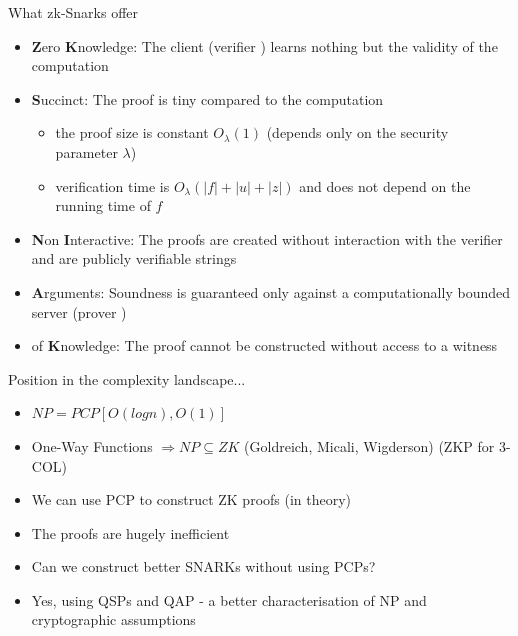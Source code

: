 \documentclass[handout]{beamer}
\begin{document}
\begin{frame}{What zk-Snarks offer}
\begin{itemize}
    \item \textbf{Z}ero \textbf{K}nowledge: The client (verifier \ver) learns nothing but the validity of the computation \pause
    \item \textbf{S}uccinct: The proof is tiny compared to the computation \pause
    \begin{itemize}
        \item the proof size is constant $O_{\lambda}(1)$ (depends only on the security parameter $\lambda$)
        \item verification time is $O_{\lambda}(|f| + |u| + |z|)$ and does not depend on the running time of $f$
    \end{itemize} \pause
    \item \textbf{N}on \textbf{I}nteractive: The proofs are created without interaction with the verifier and are publicly verifiable strings \pause
    \item \textbf{A}rguments: Soundness is guaranteed only against a computationally bounded server (prover \prv) \pause
    \item of \textbf{K}nowledge: The proof cannot be constructed without access to a witness
\end{itemize}
\end{frame}

\begin{frame}{Position in the complexity landscape...}
    \begin{itemize}
        \item $NP = PCP[O(logn),O(1)]$ \pause
        \item One-Way Functions $ \Rightarrow NP \subseteq ZK$ (Goldreich, Micali, Wigderson) (ZKP for 3-COL) \pause
        \item We can use PCP to construct ZK proofs (in theory) \pause
        \item The proofs are hugely inefficient \pause
        \item Can we construct better SNARKs without using PCPs? \pause
        \item Yes, using QSPs and QAP - a better characterisation of NP and cryptographic assumptions
    \end{itemize}
\end{frame}
\end{document}
